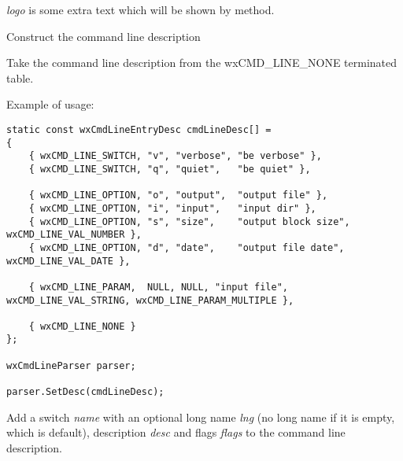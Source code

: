 


\label{wxcmdlineparsersetlogo}


{\it logo} is some extra text which will be shown by 
 method.


\label{wxcmdlineparsersetdesc}


Construct the command line description

Take the command line description from the wxCMD\_LINE\_NONE terminated table.

Example of usage:

\begin{verbatim}
static const wxCmdLineEntryDesc cmdLineDesc[] =
{
    { wxCMD_LINE_SWITCH, "v", "verbose", "be verbose" },
    { wxCMD_LINE_SWITCH, "q", "quiet",   "be quiet" },

    { wxCMD_LINE_OPTION, "o", "output",  "output file" },
    { wxCMD_LINE_OPTION, "i", "input",   "input dir" },
    { wxCMD_LINE_OPTION, "s", "size",    "output block size", wxCMD_LINE_VAL_NUMBER },
    { wxCMD_LINE_OPTION, "d", "date",    "output file date", wxCMD_LINE_VAL_DATE },

    { wxCMD_LINE_PARAM,  NULL, NULL, "input file", wxCMD_LINE_VAL_STRING, wxCMD_LINE_PARAM_MULTIPLE },

    { wxCMD_LINE_NONE }
};

wxCmdLineParser parser;

parser.SetDesc(cmdLineDesc);
\end{verbatim}


\label{wxcmdlineparseraddswitch}


Add a switch {\it name} with an optional long name {\it lng} (no long name if it
is empty, which is default), description {\it desc} and flags {\it flags} to the
command line description.


\label{wxcmdlineparseraddoption}

